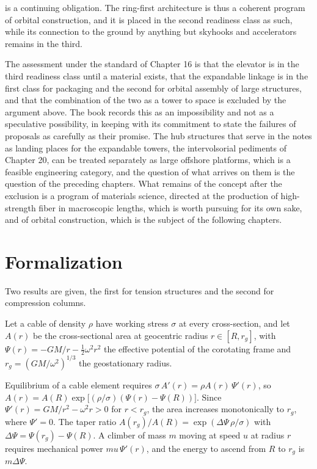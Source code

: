 is a continuing obligation. The ring-first architecture is thus a coherent program of orbital construction, and it is placed in the second readiness class as such, while its connection to the ground by anything but skyhooks and accelerators remains in the third.

The assessment under the standard of Chapter 16 is that the elevator is in the third readiness class until a material exists, that the expandable linkage is in the first class for packaging and the second for orbital assembly of large structures, and that the combination of the two as a tower to space is excluded by the argument above. The book records this as an impossibility and not as a speculative possibility, in keeping with its commitment to state the failures of proposals as carefully as their promise. The hub structures that serve in the notes as landing places for the expandable towers, the intervolsorial pediments of Chapter 20, can be treated separately as large offshore platforms, which is a feasible engineering category, and the question of what arrives on them is the question of the preceding chapters. What remains of the concept after the exclusion is a program of materials science, directed at the production of high-strength fiber in macroscopic lengths, which is worth pursuing for its own sake, and of orbital construction, which is the subject of the following chapters.

\section*{Formalization}

Two results are given, the first for tension structures and the second for compression columns.

Let a cable of density $\rho$ have working stress $\sigma$ at every cross-section, and let $A(r)$ be the cross-sectional area at geocentric radius $r\in[R,r_g]$, with $\Psi(r)=-GM/r-\tfrac12\omega^2r^2$ the effective potential of the corotating frame and $r_g=(GM/\omega^2)^{1/3}$ the geostationary radius.

\begin{proposition}
Equilibrium of a cable element requires $\sigma\,A'(r)=\rho A(r)\,\Psi'(r)$, so $A(r)=A(R)\exp\!\big[(\rho/\sigma)(\Psi(r)-\Psi(R))\big]$. Since $\Psi'(r)=GM/r^2-\omega^2r>0$ for $r<r_g$, the area increases monotonically to $r_g$, where $\Psi'=0$. The taper ratio $A(r_g)/A(R)=\exp(\Delta\Psi\,\rho/\sigma)$ with $\Delta\Psi=\Psi(r_g)-\Psi(R)$. A climber of mass $m$ moving at speed $u$ at radius $r$ requires mechanical power $mu\,\Psi'(r)$, and the energy to ascend from $R$ to $r_g$ is $m\Delta\Psi$.
\end{proposition}

